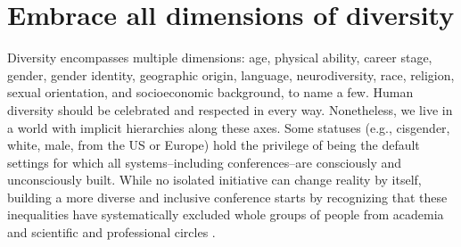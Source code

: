 \documentclass[10pt,letterpaper]{article}
\begin{document}


\section{Embrace all dimensions of diversity}
\label{rule_diversity}

Diversity encompasses multiple dimensions: age, physical ability, career stage, gender, gender identity, geographic origin, language, neurodiversity, race, religion, sexual orientation, and socioeconomic background, to name a few. 
Human diversity should be celebrated and respected in every way. Nonetheless, we live in a world with implicit hierarchies along these axes. Some statuses (e.g., cisgender, white, male, from the US or Europe) hold the privilege of being the default settings for which all systems--including conferences--are consciously and unconsciously built.  
While no isolated initiative can change reality by itself, building a more diverse and inclusive conference starts by recognizing that these inequalities have systematically excluded whole groups of people from academia and scientific and professional circles \cite{timperleyHeMoanaPukepuke2020}. 
\end{document}
